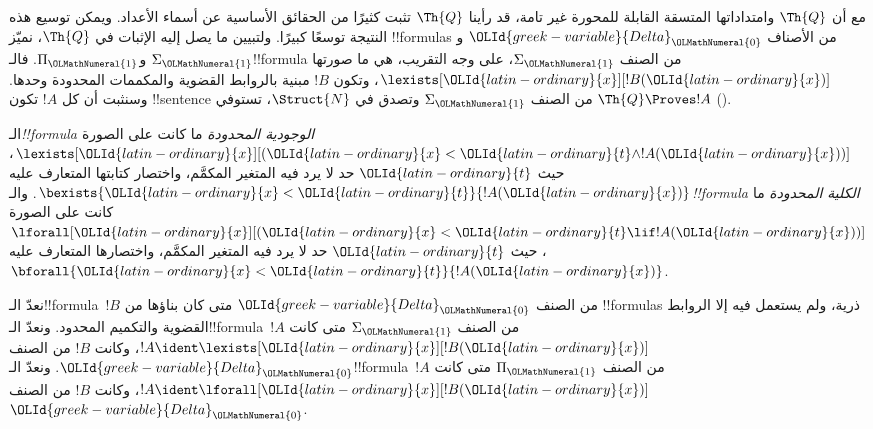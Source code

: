 \documentclass[../../../include/open-logic-section]{subfiles}
\begin{document}

مع أن $\Th{Q}$ وامتداداتها المتسقة القابلة للمحورة غير تامة،
قد رأينا $\Th{Q}$ تثبت كثيرًا من الحقائق الأساسية عن أسماء الأعداد.
ويمكن توسيع هذه النتيجة توسعًا كبيرًا. ولتبيين ما يصل إليه الإثبات في
$\Th{Q}$، نميّز !!{formula}s من الأصناف ${\OLId{greek-variable}{Delta}}_{\OLMathNumeral{0}}$ و
$\Sigma_{\OLMathNumeral{1}}$ و$\Pi_{\OLMathNumeral{1}}$.
فالـ!!{formula} من الصنف $\Sigma_{\OLMathNumeral{1}}$، على وجه التقريب،
هي ما صورتها $\lexists[{\OLId{latin-ordinary}{x}}][!B({\OLId{latin-ordinary}{x}})]$، وتكون $!B$ مبنية بالروابط القضوية
والمكممات المحدودة وحدها. وسنثبت أن كل $!A$ تكون !!{sentence}
من الصنف $\Sigma_{\OLMathNumeral{1}}$ وتصدق في $\Struct{N}$،
تستوفي $\Th{Q}\Proves !A$ ().

\begin{defn}
الـ\emph{!!{formula} الوجودية المحدودة} ما كانت على الصورة
$\lexists[{\OLId{latin-ordinary}{x}}][({\OLId{latin-ordinary}{x}}<{\OLId{latin-ordinary}{t}}\land !A({\OLId{latin-ordinary}{x}}))]$، حيث ${\OLId{latin-ordinary}{t}}$ حد لا يرد فيه المتغير المكمَّم،
واختصار كتابتها المتعارف عليه $\bexists{{\OLId{latin-ordinary}{x}}<{\OLId{latin-ordinary}{t}}}{!A({\OLId{latin-ordinary}{x}})}$.
%
والـ\emph{!!{formula} الكلية المحدودة} ما كانت على الصورة
$\lforall[{\OLId{latin-ordinary}{x}}][({\OLId{latin-ordinary}{x}}<{\OLId{latin-ordinary}{t}}\lif !A({\OLId{latin-ordinary}{x}}))]$، حيث ${\OLId{latin-ordinary}{t}}$ حد لا يرد فيه المتغير المكمَّم،
واختصارها المتعارف عليه $\bforall{{\OLId{latin-ordinary}{x}}<{\OLId{latin-ordinary}{t}}}{!A({\OLId{latin-ordinary}{x}})}$.
\end{defn}

\begin{defn}
نعدّ الـ!!{formula}~$!B$ من الصنف ${\OLId{greek-variable}{Delta}}_{\OLMathNumeral{0}}$ متى كان بناؤها من
!!{formula}s ذرية، ولم يستعمل فيه إلا الروابط القضوية والتكميم المحدود.
%
ونعدّ الـ!!{formula}~$!A$ من الصنف $\Sigma_{\OLMathNumeral{1}}$ متى كانت
$!A\ident\lexists[{\OLId{latin-ordinary}{x}}][!B({\OLId{latin-ordinary}{x}})]$، وكانت $!B$ من الصنف ${\OLId{greek-variable}{Delta}}_{\OLMathNumeral{0}}$.
%
ونعدّ الـ!!{formula}~$!A$ من الصنف $\Pi_{\OLMathNumeral{1}}$ متى كانت
$!A\ident\lforall[{\OLId{latin-ordinary}{x}}][!B({\OLId{latin-ordinary}{x}})]$، وكانت $!B$ من الصنف ${\OLId{greek-variable}{Delta}}_{\OLMathNumeral{0}}$.
\end{defn}
\end{document}
